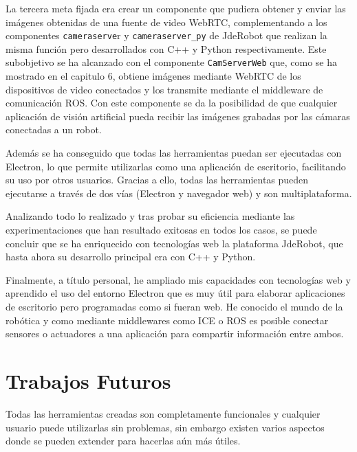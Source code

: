 La tercera meta fijada era crear un componente que pudiera obtener y enviar las imágenes obtenidas de una fuente de video WebRTC, complementando a los componentes \texttt{cameraserve}r y \texttt{cameraserver\_py} de JdeRobot que realizan la misma función pero desarrollados con C++ y Python respectivamente. Este subobjetivo se ha alcanzado con el componente \texttt{CamServerWeb} que, como se ha mostrado en el capitulo 6, obtiene imágenes mediante WebRTC de los dispositivos de video conectados y los transmite mediante el middleware de comunicación ROS. Con este componente se da la posibilidad de que cualquier aplicación de visión artificial pueda recibir las imágenes grabadas por las cámaras conectadas a un robot.

Además se ha conseguido que todas las herramientas puedan ser ejecutadas con Electron, lo que permite utilizarlas como una aplicación de escritorio, facilitando su uso por otros usuarios. Gracias a ello, todas las herramientas pueden ejecutarse a través de dos vías (Electron y navegador web) y son multiplataforma.

Analizando todo lo realizado y tras probar su eficiencia mediante las experimentaciones que han resultado exitosas en todos los casos, se puede concluir que se ha enriquecido con tecnologías web la plataforma JdeRobot, que hasta ahora su desarrollo principal era con C++ y Python.

Finalmente, a título personal, he ampliado mis capacidades con tecnologías web y aprendido el uso del entorno Electron que es muy útil para elaborar aplicaciones de escritorio pero programadas como si fueran web. He conocido el mundo de la robótica y como mediante middlewares como ICE o ROS es posible conectar sensores o actuadores a una aplicación para compartir información entre ambos.

\section{Trabajos Futuros}
Todas las herramientas creadas son completamente funcionales y cualquier usuario puede utilizarlas sin problemas, sin embargo existen varios aspectos donde se pueden extender para hacerlas aún más útiles.

